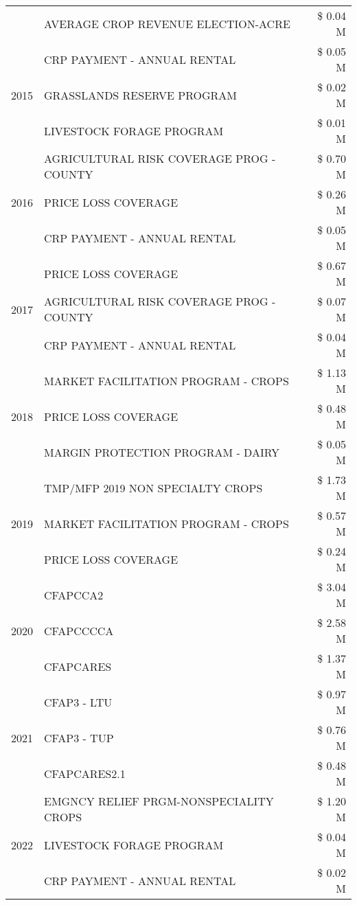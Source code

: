 \begin{tabular}{llr}
 & AVERAGE CROP REVENUE ELECTION-ACRE & \$ 0.04 M \\
\cline{1-3}
\multirow[t]{3}{*}{2015} & CRP PAYMENT - ANNUAL RENTAL & \$ 0.05 M \\
 & GRASSLANDS RESERVE PROGRAM & \$ 0.02 M \\
 & LIVESTOCK FORAGE PROGRAM & \$ 0.01 M \\
\cline{1-3}
\multirow[t]{3}{*}{2016} & AGRICULTURAL RISK COVERAGE PROG - COUNTY & \$ 0.70 M \\
 & PRICE LOSS COVERAGE & \$ 0.26 M \\
 & CRP PAYMENT - ANNUAL RENTAL & \$ 0.05 M \\
\cline{1-3}
\multirow[t]{3}{*}{2017} & PRICE LOSS COVERAGE & \$ 0.67 M \\
 & AGRICULTURAL RISK COVERAGE PROG - COUNTY & \$ 0.07 M \\
 & CRP PAYMENT - ANNUAL RENTAL & \$ 0.04 M \\
\cline{1-3}
\multirow[t]{3}{*}{2018} & MARKET FACILITATION PROGRAM - CROPS & \$ 1.13 M \\
 & PRICE LOSS COVERAGE & \$ 0.48 M \\
 & MARGIN PROTECTION PROGRAM - DAIRY & \$ 0.05 M \\
\cline{1-3}
\multirow[t]{3}{*}{2019} & TMP/MFP 2019 NON SPECIALTY CROPS & \$ 1.73 M \\
 & MARKET FACILITATION PROGRAM - CROPS & \$ 0.57 M \\
 & PRICE LOSS COVERAGE & \$ 0.24 M \\
\cline{1-3}
\multirow[t]{3}{*}{2020} & CFAPCCA2 & \$ 3.04 M \\
 & CFAPCCCCA & \$ 2.58 M \\
 & CFAPCARES & \$ 1.37 M \\
\cline{1-3}
\multirow[t]{3}{*}{2021} & CFAP3 - LTU & \$ 0.97 M \\
 & CFAP3 - TUP & \$ 0.76 M \\
 & CFAPCARES2.1 & \$ 0.48 M \\
\cline{1-3}
\multirow[t]{3}{*}{2022} & EMGNCY RELIEF PRGM-NONSPECIALITY CROPS & \$ 1.20 M \\
 & LIVESTOCK FORAGE PROGRAM & \$ 0.04 M \\
 & CRP PAYMENT - ANNUAL RENTAL & \$ 0.02 M \\
\cline{1-3}
\bottomrule
\end{tabular}

